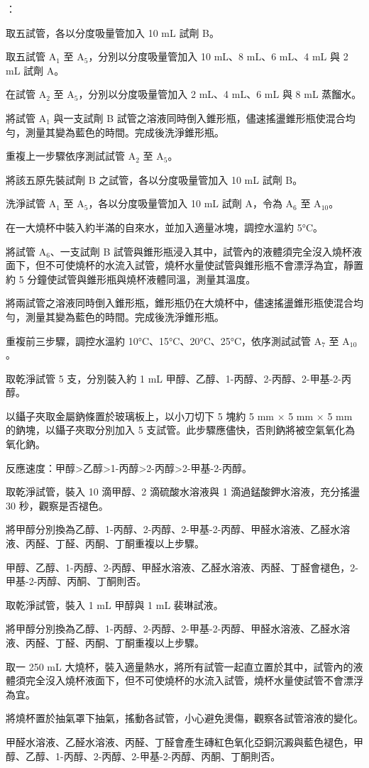 \documentclass[a4paper,12pt]{article}
\begin{document}
：
\ben
\item 取五試管，各以分度吸量管加入 10 mL 試劑 B。
\item 取五試管 A$_1$ 至 A$_5$，分別以分度吸量管加入 10 mL、8 mL、6 mL、4 mL 與 2 mL 試劑 A。
\item 在試管 A$_2$ 至 A$_5$，分別以分度吸量管加入 2 mL、4 mL、6 mL 與 8 mL 蒸餾水。
\item 將試管 A$_1$ 與一支試劑 B 試管之溶液同時倒入錐形瓶，儘速搖盪錐形瓶使混合均勻，測量其變為藍色的時間。完成後洗淨錐形瓶。
\item 重複上一步驟依序測試試管 A$_2$ 至 A$_5$。
\item 將該五原先裝試劑 B 之試管，各以分度吸量管加入 10 mL 試劑 B。
\item 洗淨試管 A$_1$ 至 A$_5$，各以分度吸量管加入 10 mL 試劑 A，令為 A$_6$ 至 A$_{10}$。
\item 在一大燒杯中裝入約半滿的自來水，並加入適量冰塊，調控水溫約 5°C。
\item 將試管 A$_6$、一支試劑 B 試管與錐形瓶浸入其中，試管內的液體須完全沒入燒杯液面下，但不可使燒杯的水流入試管，燒杯水量使試管與錐形瓶不會漂浮為宜，靜置約 5 分鐘使試管與錐形瓶與燒杯液體同溫，測量其溫度。
\item 將兩試管之溶液同時倒入錐形瓶，錐形瓶仍在大燒杯中，儘速搖盪錐形瓶使混合均勻，測量其變為藍色的時間。完成後洗淨錐形瓶。
\item 重複前三步驟，調控水溫約 10°C、15°C、20°C、25°C，依序測試試管 A$_7$ 至 A$_{10}$。
\een
{}
\ben
\item 取乾淨試管 5 支，分別裝入約 1 mL 甲醇、乙醇、1-丙醇、2-丙醇、2-甲基-2-丙醇。
\item 以鑷子夾取金屬鈉條置於玻璃板上，以小刀切下 5 塊約 5 mm $\times$ 5 mm $\times$ 5 mm 的鈉塊，以鑷子夾取分別加入 5 支試管。此步驟應儘快，否則鈉將被空氣氧化為氧化鈉。
\item 反應速度：甲醇>乙醇>1-丙醇>2-丙醇>2-甲基-2-丙醇。
\een
{}
\ben
\item 取乾淨試管，裝入 10 滴甲醇、2 滴硫酸水溶液與 1 滴過錳酸鉀水溶液，充分搖盪 30 秒，觀察是否褪色。
\item 將甲醇分別換為乙醇、1-丙醇、2-丙醇、2-甲基-2-丙醇、甲醛水溶液、乙醛水溶液、丙醛、丁醛、丙酮、丁酮重複以上步驟。
\item 甲醇、乙醇、1-丙醇、2-丙醇、甲醛水溶液、乙醛水溶液、丙醛、丁醛會褪色，2-甲基-2-丙醇、丙酮、丁酮則否。
\een
{}
\ben
\item 取乾淨試管，裝入 1 mL 甲醇與 1 mL 裴琳試液。
\item 將甲醇分別換為乙醇、1-丙醇、2-丙醇、2-甲基-2-丙醇、甲醛水溶液、乙醛水溶液、丙醛、丁醛、丙酮、丁酮重複以上步驟。
\item 取一 250 mL 大燒杯，裝入適量熱水，將所有試管一起直立置於其中，試管內的液體須完全沒入燒杯液面下，但不可使燒杯的水流入試管，燒杯水量使試管不會漂浮為宜。
\item 將燒杯置於抽氣罩下抽氣，搖動各試管，小心避免燙傷，觀察各試管溶液的變化。
\item 甲醛水溶液、乙醛水溶液、丙醛、丁醛會產生磚紅色氧化亞銅沉澱與藍色褪色，甲醇、乙醇、1-丙醇、2-丙醇、2-甲基-2-丙醇、丙酮、丁酮則否。
\een
\end{document}
